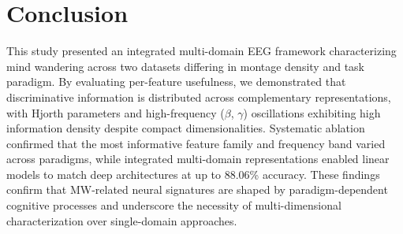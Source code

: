 \documentclass[conference]{IEEEtran}
\begin{document}
\begin{table}[h]
\centering
\caption{Ablation analysis using SVM on raw EEG}
\label{tab:ablation_comparison}
\end{table}
\section{Conclusion}

This study presented an integrated multi-domain EEG framework characterizing mind wandering across two datasets differing in montage density and task paradigm. By evaluating per-feature usefulness, we demonstrated that discriminative information is distributed across complementary representations, with Hjorth parameters and high-frequency ($\beta$, $\gamma$) oscillations exhibiting high information density despite compact dimensionalities. Systematic ablation confirmed that the most informative feature family and frequency band varied across paradigms, while integrated multi-domain representations enabled linear models to match deep architectures at up to 88.06\% accuracy. These findings confirm that MW-related neural signatures are shaped by paradigm-dependent cognitive processes and underscore the necessity of multi-dimensional characterization over single-domain approaches.
\end{document}

